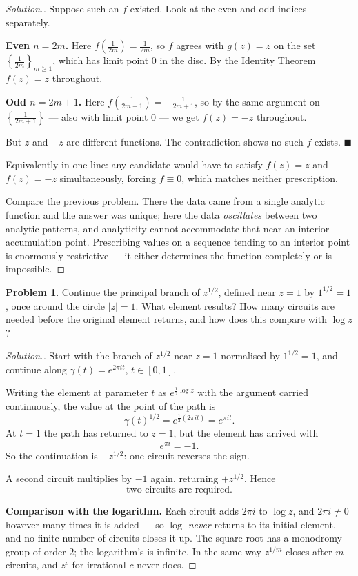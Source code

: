 \documentclass[11pt,a4paper]{article}
\theoremstyle{definition}
\newtheorem{problemx}{Problem}[section]
\newenvironment{problem}{\begin{problemx}}{\end{problemx}}
\newenvironment{solution}
  {\renewcommand{\qedsymbol}{}\begin{proof}[\textit{Solution}.]}
  {\end{proof}}
\begin{document}
\begin{solution}
Suppose such an $f$ existed. Look at the even and odd indices separately.

\textbf{Even $n = 2m$.} Here $f\!\left(\tfrac{1}{2m}\right) = \tfrac{1}{2m}$, so
$f$ agrees with $g(z) = z$ on the set
$\left\{\tfrac{1}{2m}\right\}_{m\geq1}$, which has limit point $0$ in the disc. By
the Identity Theorem $f(z) = z$ throughout.

\textbf{Odd $n = 2m+1$.} Here $f\!\left(\tfrac{1}{2m+1}\right) = -\tfrac{1}{2m+1}$,
so by the same argument on $\left\{\tfrac{1}{2m+1}\right\}$ --- also with limit
point $0$ --- we get $f(z) = -z$ throughout.

But $z$ and $-z$ are different functions. The contradiction shows no such $f$
exists. $\blacksquare$

Equivalently in one line: any candidate would have to satisfy $f(z) = z$ and
$f(z) = -z$ simultaneously, forcing $f \equiv 0$, which matches neither
prescription.

Compare the previous problem. There the data came from a single analytic function
and the answer was unique; here the data \emph{oscillates} between two analytic
patterns, and analyticity cannot accommodate that near an interior accumulation
point. Prescribing values on a sequence tending to an interior point is
enormously restrictive --- it either determines the function completely or is
impossible.
\end{solution}


\begin{problem}
Continue the principal branch of $z^{1/2}$, defined near $z = 1$ by
$1^{1/2} = 1$, once around the circle $\left|z\right| = 1$. What element results?
How many circuits are needed before the original element returns, and how does
this compare with $\log z$?
\end{problem}

\begin{solution}
Start with the branch of $z^{1/2}$ near $z = 1$ normalised by $1^{1/2} = 1$, and
continue along $\gamma(t) = e^{2\pi i t}$, $t \in [0,1]$.

Writing the element at parameter $t$ as $e^{\frac12 \log z}$ with the argument
carried continuously, the value at the point of the path is
$$\gamma(t)^{1/2} = e^{\frac12 (2\pi i t)} = e^{\pi i t}.$$
At $t = 1$ the path has returned to $z = 1$, but the element has arrived with
$$e^{\pi i} = -1 .$$
So the continuation is $-z^{1/2}$: one circuit reverses the sign.

A second circuit multiplies by $-1$ again, returning $+z^{1/2}$. Hence
$$\boxed{\text{two circuits are required.}}$$

\textbf{Comparison with the logarithm.} Each circuit adds $2\pi i$ to $\log z$, and
$2\pi i \neq 0$ however many times it is added --- so $\log$ \emph{never} returns
to its initial element, and no finite number of circuits closes it up. The square
root has a monodromy group of order $2$; the logarithm's is infinite. In the same
way $z^{1/m}$ closes after $m$ circuits, and $z^{c}$ for irrational $c$ never
does.
\end{solution}
\end{document}

